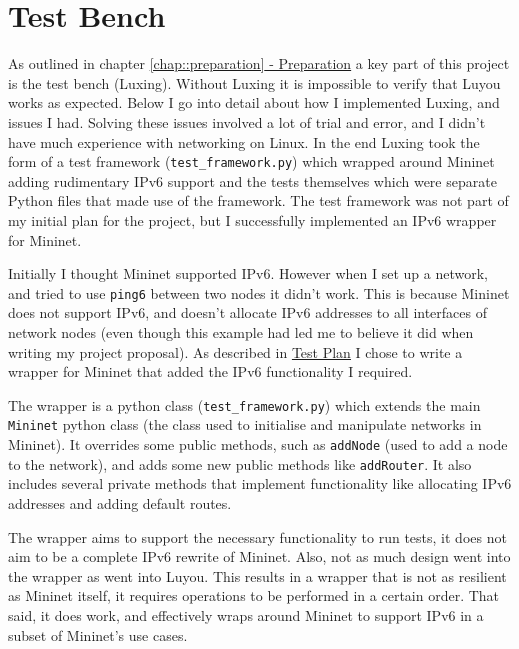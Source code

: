 \documentclass[12pt,a4paper,twoside,openany]{report}
\begin{document}
\section{Test Bench}

As outlined in chapter \ref{chap::preparation}\hyperref[chap::preparation]{ - Preparation} a key part of this project is the test bench (Luxing). Without Luxing it is impossible to verify that Luyou works as expected.  Below I go into detail about how I implemented Luxing, and issues I had.  Solving these issues involved a lot of trial and error, and I didn't have much experience with networking on Linux.  In the end Luxing took the form of a test framework (\verb!test_framework.py!) which wrapped around Mininet adding rudimentary IPv6 support and the tests themselves which were separate Python files that made use of the framework. The test framework was not part of my initial plan for the project, but I successfully implemented an IPv6 wrapper for Mininet.

\bigskip

Initially I thought Mininet\cite{mininet} supported IPv6.  However when I set up a network, and tried to use \verb!ping6! between two nodes it didn't work.  This is because Mininet does not support IPv6, and doesn't allocate IPv6 addresses to all interfaces of network nodes (even though this example\cite{tw_mininet} had led me to believe it did when writing my project proposal).  As described in \hyperref[sec::test_plan]{Test Plan} I chose to write a wrapper for Mininet that added the IPv6 functionality I required.  

\bigskip

The wrapper is a python class (\verb!test_framework.py!) which extends the main \verb!Mininet! python class (the class used to initialise and manipulate networks in Mininet). It overrides some public methods, such as \verb!addNode! (used to add a node to the network), and adds some new public methods like \verb!addRouter!.  It also includes several private methods that implement functionality like allocating IPv6 addresses and adding default routes.  

\bigskip

The wrapper aims to support the necessary functionality to run tests, it does not aim to be a complete IPv6 rewrite of Mininet. Also, not as much design went into the wrapper as went into Luyou. This results in a wrapper that is not as resilient as Mininet itself, it requires operations to be performed in a certain order.  That said, it does work, and effectively wraps around Mininet to support IPv6 in a subset of Mininet's use cases.
\end{document}
